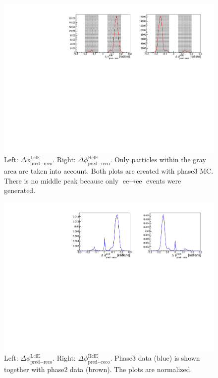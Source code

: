 \documentclass[a4paper,11pt,twosided,final,german,openbib,pdftex,listof=totoc,bibliography=totoc]{scrbook}
\begin{document}
\begin{appendix}
\begin{figure}[h!]
	\centering
	\includegraphics[width=\textwidth]{Plots/master3/hb2b_MCP3.pdf}
	\caption[b2bClusterPhi - clusterPhi For Phase3 MC]{Left: $\Delta \phi _{\textrm{pred} - \textrm{reco}}^{\textrm{LclE}}$. Right:  $\Delta \phi _{\textrm{pred} - \textrm{reco}}^{\textrm{HclE}}$. Only particles within the gray area are taken into account. Both plots are created with phase3 MC. There is no middle peak because only $\textrm{ee} \rightarrow \textrm{ee}$ events were generated.}
	\label{fig:b2bMC3}
\end{figure}










\begin{figure}[h!]
	\centering
	\includegraphics[width=\textwidth]{Plots/comp/cb2b.pdf}
	\caption[Normalized b2bClusterPhi - clusterPhi For Phase2 And Phase3 Data]{Left: $\Delta \phi _{\textrm{pred} - \textrm{reco}}^{\textrm{LclE}}$. Right:  $\Delta \phi _{\textrm{pred} - \textrm{reco}}^{\textrm{HclE}}$. Phase3 data (blue) is shown together with phase2 data (brown). The plots are normalized.}
	\label{fig:Cb2bData}
\end{figure}






\end{appendix}
\end{document}
